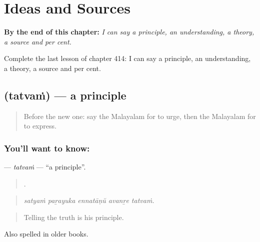 
\chapter{Ideas and Sources}
\label{ch:ml-ideas-and-sources}

\begin{chapteropening}
\textbf{By the end of this chapter:} \emph{I can say a principle, an understanding, a theory, a source and per cent.}

Complete the last lesson of chapter 414: I can say a principle, an understanding, a theory, a source and per cent.
\end{chapteropening}

\section[\texorpdfstring{\ml{തത്വം} (tatvaṁ)}{തത്വം (tatvaṁ)}]{ (tatvaṁ) — a principle}

\label{lesson:ML-C414-tatvam}



\begin{quote}
Before the new one: say the Malayalam for to urge, then the Malayalam for to express.
\end{quote}

\subsection*{You'll want to know: }
\textbf{} — \emph{tatvaṁ} — \textquotedblleft{}a principle\textquotedblright{}.

\begin{quote}
    .
\end{quote}

\begin{quote}
\emph{satyaṁ paṟayuka ennatāṇŭ avanṟe tatvaṁ.}
\end{quote}

\begin{quote}
Telling the truth is his principle.
\end{quote}

Also spelled  in older books.

